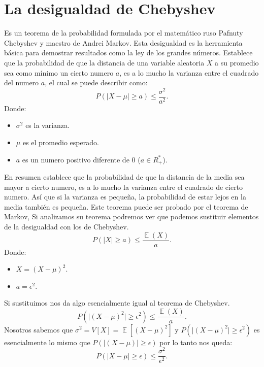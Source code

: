 \documentclass[]{article}
\DeclareMathOperator{\EX}{\mathbb{E}}%
\begin{document}
\section{La desigualdad de Chebyshev}
Es un teorema de la probabilidad formulada por el matemático ruso Pafnuty Chebyshev y maestro de Andrei Markov.
Esta desigualdad es la herramienta básica para demostrar resultados como la ley de los grandes números.
Establece que la probabilidad de que la distancia de una variable aleatoria $X$ a su promedio sea como mínimo un cierto numero $a$, es a lo mucho la varianza entre el cuadrado del numero $a$, el cual se puede describir como:
\[ P(\lvert X - \mu \lvert \geq a) \leq \frac{\sigma^{2}}{a^{2}}.\]
Donde:
\begin{itemize}
	\item $\sigma^{2}$ es la varianza.
	\item $\mu$ es el promedio esperado.
	\item $a$ es un numero positivo diferente de 0 ($a \in R_{+}^{*}$).
\end{itemize}
En resumen establece que la probabilidad de que la distancia de la media sea mayor a cierto numero, es a lo mucho la varianza entre el cuadrado de cierto numero.
Así que si la varianza es pequeña, la probabilidad de estar lejos en la media también es pequeña.
Este teorema puede ser probado por el teorema de Markov, Si analizamos su teorema podremos ver que podemos sustituir elementos de la desigualdad con los de Chebyshev.
\[ P(\lvert X \lvert \geq a) \leq \frac{\EX(X)}{a}.  \]
Donde:
\begin{itemize}
	\item $X = (X - \mu)^{2}$.
	\item $a = \epsilon^{2}$.
\end{itemize}

Si sustituimos nos da algo esencialmente igual al teorema de Chebyshev.
\[ P(\lvert (X-\mu)^{2} \lvert \geq \epsilon^{2}) \leq \frac{\EX(X)}{a}.\]
Nosotros sabemos que $\sigma^{2} = V[X] =\EX[(X-\mu)^{2}]$ y $P(\lvert (X-\mu)^{2} \lvert \geq \epsilon^{2})$ es esencialmente lo mismo que $P(\lvert (X-\mu) \lvert \geq \epsilon)$ por lo tanto nos queda:
\[ P(\lvert X-\mu \lvert \geq \epsilon) \leq \frac{\sigma^{2}}{\epsilon^{2}}.  \]
\end{document}
